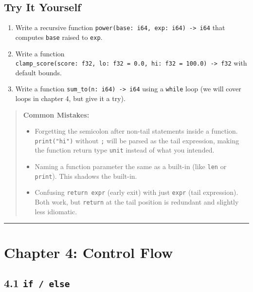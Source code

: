 \documentclass[
  english,
]{book}
\providecommand{\tightlist}{%
  \setlength{\itemsep}{0pt}\setlength{\parskip}{0pt}}
\begin{document}
\subsection{Try It Yourself}\label{try-it-yourself-2}

\begin{enumerate}
\def\labelenumi{\arabic{enumi}.}
\tightlist
\item
  Write a recursive function
  \texttt{power(base:\ i64,\ exp:\ i64)\ -\textgreater{}\ i64} that
  computes \texttt{base} raised to \texttt{exp}.
\item
  Write a function
  \texttt{clamp\_score(score:\ f32,\ lo:\ f32\ =\ 0.0,\ hi:\ f32\ =\ 100.0)\ -\textgreater{}\ f32}
  with default bounds.
\item
  Write a function \texttt{sum\_to(n:\ i64)\ -\textgreater{}\ i64} using
  a \texttt{while} loop (we will cover loops in chapter 4, but give it a
  try).
\end{enumerate}

\begin{quote}
\textbf{Common Mistakes:}

\begin{itemize}
\tightlist
\item
  Forgetting the semicolon after non-tail statements inside a function.
  \texttt{print("hi")} without \texttt{;} will be parsed as the tail
  expression, making the function return type \texttt{unit} instead of
  what you intended.
\item
  Naming a function parameter the same as a built-in (like \texttt{len}
  or \texttt{print}). This shadows the built-in.
\item
  Confusing \texttt{return\ expr} (early exit) with just \texttt{expr}
  (tail expression). Both work, but \texttt{return} at the tail position
  is redundant and slightly less idiomatic.
\end{itemize}
\end{quote}

\begin{center}\rule{0.5\linewidth}{0.5pt}\end{center}

\section{Chapter 4: Control Flow}\label{chapter-4-control-flow}

\subsection{\texorpdfstring{4.1
\texttt{if\ /\ else}}{4.1 if / else}}\label{if-else}
\end{document}
